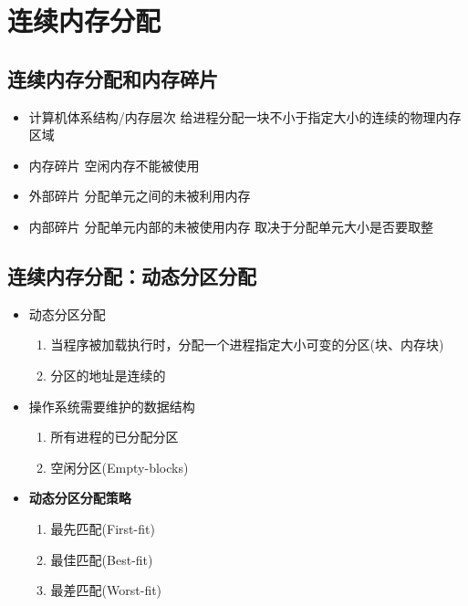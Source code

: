 \section{连续内存分配}
\subsection{连续内存分配和内存碎片}
\begin{itemize}
	\item 计算机体系结构/内存层次
	\subitem 给进程分配一块不小于指定大小的连续的物理内存区域
	\item 内存碎片
	\subitem 空闲内存不能被使用
	\item 外部碎片
	\subitem 分配单元之间的未被利用内存
	\item 内部碎片
	\subitem 分配单元内部的未被使用内存
	\subitem 取决于分配单元大小是否要取整
\end{itemize}
\subsection{连续内存分配：动态分区分配}
\begin{itemize}
	\item 动态分区分配
	\begin{enumerate}
		\item 当程序被加载执行时，分配一个进程指定大小可变的分区(块、内存块)
		\item 分区的地址是连续的
	\end{enumerate}
	\item 操作系统需要维护的数据结构
	\begin{enumerate}
		\item 所有进程的已分配分区
		\item 空闲分区(Empty-blocks)
	\end{enumerate}
	\item \textbf{动态分区分配策略}
	\begin{enumerate}
		\item 最先匹配(First-fit)
		\item 最佳匹配(Best-fit)
		\item 最差匹配(Worst-fit)
	\end{enumerate}
\end{itemize}
